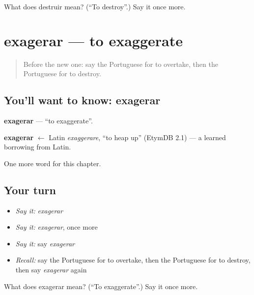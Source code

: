 \begin{tcolorbox}[breakable,colback=teal!4,colframe=teal!35!black,title={Before you move on}]
What does destruir mean? (\textquotedblleft{}To destroy\textquotedblright{}.) Say it once more.
\end{tcolorbox}
\section[exagerar]{exagerar — to exaggerate}

\label{lesson:PT-C237-exagerar}



\begin{quote}
Before the new one: say the Portuguese for to overtake, then the Portuguese for to destroy.
\end{quote}

\subsection*{You'll want to know: exagerar}
\textbf{exagerar} — \textquotedblleft{}to exaggerate\textquotedblright{}.

\begin{cousinweb}
\textbf{exagerar} $\leftarrow$ Latin \emph{exaggerare}, \textquotedblleft{}to heap up\textquotedblright{} (EtymDB 2.1) — a learned borrowing from Latin.
\end{cousinweb}

\begin{grammarlens}[title={What you've built}]
One more word for this chapter.
\end{grammarlens}

\subsection*{Your turn}
\begin{itemize}
\raggedright
  \item \emph{Say it:} \emph{exagerar}
  \item \emph{Say it:} \emph{exagerar}, once more
  \item \emph{Say it:} say \emph{exagerar}
  \item \emph{Recall:} say the Portuguese for to overtake, then the Portuguese for to destroy, then say \emph{exagerar} again
\end{itemize}

\begin{tcolorbox}[breakable,colback=teal!4,colframe=teal!35!black,title={Before you move on}]
What does exagerar mean? (\textquotedblleft{}To exaggerate\textquotedblright{}.) Say it once more.
\end{tcolorbox}
